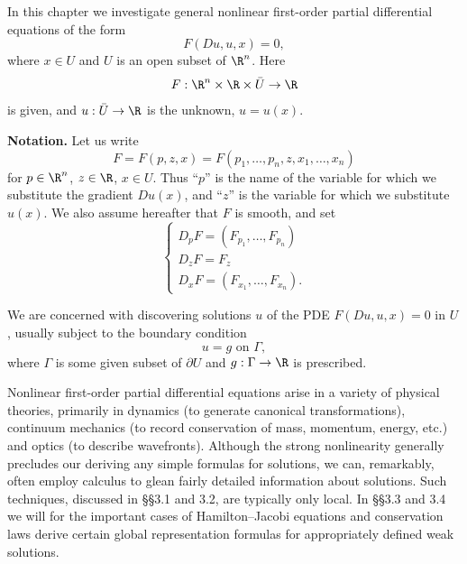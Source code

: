 %


In this chapter we investigate general nonlinear first-order partial differential equations of the form
$$F(Du, u, x) = 0,$$
where $x \in U$ and $U$ is an open subset of $\R^n$. Here
$$F : \R^n \times \R \times \bar{U} \to \R$$
is given, and $u : \bar{U} \to \R$ is the unknown, $u = u(x)$.

\textbf{Notation.} Let us write
$$F = F(p, z, x) = F(p_1, \ldots, p_n, z, x_1, \ldots, x_n)$$
for $p \in \R^n$, $z \in \R$, $x \in U$. Thus ``$p$'' is the name of the variable for which we substitute the gradient $Du(x)$, and ``$z$'' is the variable for which we substitute $u(x)$. We also assume hereafter that $F$ is smooth, and set
$$\begin{cases}
D_p F = (F_{p_1}, \ldots, F_{p_n}) \\
D_z F = F_z \\
D_x F = (F_{x_1}, \ldots, F_{x_n}).
\end{cases}$$

We are concerned with discovering solutions $u$ of the PDE $F(Du, u, x) = 0$ in $U$, usually subject to the boundary condition
$$u = g \text{ on } \Gamma,$$
where $\Gamma$ is some given subset of $\partial U$ and $g : \Gamma \to \R$ is prescribed.

Nonlinear first-order partial differential equations arise in a variety of physical theories, primarily in dynamics (to generate canonical transformations), continuum mechanics (to record conservation of mass, momentum, energy, etc.) and optics (to describe wavefronts). Although the strong nonlinearity generally precludes our deriving any simple formulas for solutions, we can, remarkably, often employ calculus to glean fairly detailed information about solutions. Such techniques, discussed in \S\S 3.1 and 3.2, are typically only local. In \S\S 3.3 and 3.4 we will for the important cases of Hamilton--Jacobi equations and conservation laws derive certain global representation formulas for appropriately defined weak solutions.

